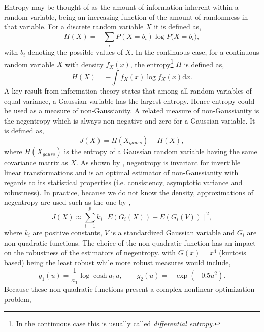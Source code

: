 Entropy may be thought of as the amount of information inherent within a random
variable, being an increasing function of the amount of randomness in that variable.
For a discrete random variable $X$ it is defined as,
\begin{equation}\label{eq:entropy1}
H(X) =  - \sum\limits_i {P(X = {b_i})\log P(X = {b_i}} ),
\end{equation}
with $b_i$ denoting the possible values of $X$. In the continuous case, for a continuous
random variable $X$ with density $f_X(x)$, the entropy\footnote{In the continuous case
this is usually called \textit{differential entropy}.} $H$ is defined as,
\begin{equation}\label{eq:entropy2}
H(X) =  - \int {f_{X}(x)\log f_{X}(x)\mathrm{d}x}.
\end{equation}
A key result from information theory states that among all random variables of
equal variance, a Gaussian variable has the largest entropy. Hence entropy could
be used as a measure of non-Gaussianity. A related measure of non-Gaussianity is
the negentropy which is always non-negative and zero for a Gaussian variable. It
is defined as,
\begin{equation}\label{eq:entropy3}
J(X) = H({X_{gauss}}) - H(X),
\end{equation}
where $H({X_{gauss}})$ is the entropy of a Gaussian random variable having the same
covariance matrix as $X$. As shown by \cite{Comon1994}, negentropy is invariant
for invertible linear transformations and is an optimal estimator of non-Gaussianity
with regards to its statistical properties (i.e. consistency, asymptotic variance
and robustness). In practice, because we do not know the density, approximations of
negentropy are used such as the one by
\cite{Hyvaerinen2000},
\begin{equation}\label{eq:entropy4}
J(X) \approx \sum\limits_{i = 1}^p {{k_i}{{[E({G_i}(X)) - E({G_i}(V))]}^2}},
\end{equation}
where $k_i$ are positive constants, $V$ is a standardized Gaussian variable and
$G_i$ are non-quadratic functions. The choice of the non-quadratic function has
an impact on the robustness of the estimators of negentropy. with $G(x)=x^4$
(kurtosis based) being the least robust while more robust measures would include,
\begin{equation}\label{eq:entropy5}
{g_1}(u) = \frac{1}{{{a_1}}}\log \cosh {a_1}u,\qquad {g_2}(u) =  - \exp ( - 0.5{u^2}).
\end{equation}
Because these non-quadratic functions present a complex nonlinear optimization problem,
